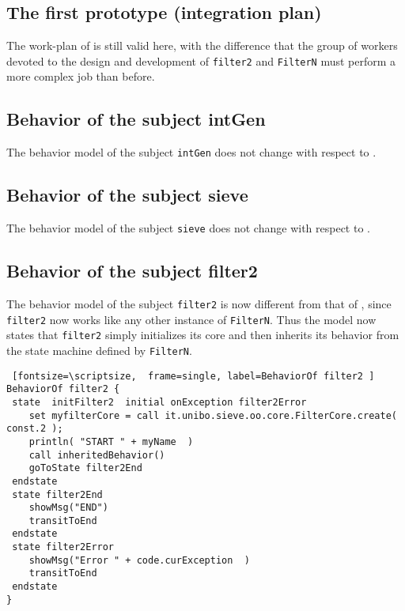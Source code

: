 \documentclass{../llncs}
\begin{document}
\subsection{The first prototype (integration plan)}

The work-plan of  is still valid here, with the difference that the group of workers devoted to the design and development of \texttt{filter2} and \texttt{FilterN} must perform a more complex job than before.


\subsection{Behavior of the subject intGen}
The behavior model of the subject \texttt{intGen} does not change with respect to .

 
\subsection{Behavior of the subject sieve}
The behavior model of the subject \texttt{sieve} does not change with respect to .

\subsection{Behavior of the subject filter2}
The behavior model of the subject \texttt{filter2} is now different from that of , since \texttt{filter2} now works like any other instance of \texttt{FilterN}. Thus the model now states that  \texttt{filter2} simply initializes its core and then inherits its behavior from the state machine defined by \texttt{FilterN}.

\begin{Verbatim} [fontsize=\scriptsize,  frame=single, label=BehaviorOf filter2 ] 
BehaviorOf filter2 {     
 state  initFilter2  initial onException filter2Error
	set myfilterCore = call it.unibo.sieve.oo.core.FilterCore.create( const.2 );  
	println( "START " + myName	)
	call inheritedBehavior()
	goToState filter2End
 endstate 	  	
 state filter2End
	showMsg("END")
	transitToEnd
 endstate
 state filter2Error
	showMsg("Error " + code.curException  ) 
	transitToEnd
 endstate
}
\end{Verbatim}
\end{document}
